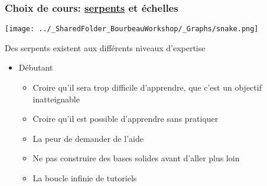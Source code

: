 \documentclass{beamer}
\begin{document}
  \begin{frame}
    
      \frametitle{Choix de cours: \uline{serpents} et échelles} \vspace{1cm}
      
        \begin{center}
        
          \texttt{[image: ../\_SharedFolder\_BourbeauWorkshop/\_Graphs/snake.png]}
         
        \end{center} 
        
  Des serpents existent aux différents niveaux d'expertise
      
    \begin{itemize}
       
      \item{Débutant}
        
          \begin{itemize}
            \item Croire qu'il sera trop difficile d'apprendre, que c'est un objectif inatteignable
            \item Croire qu'il est possible d'apprendre sans pratiquer
            \item La peur de demander de l'aide
            \item Ne pas construire des bases solides avant d'aller plus loin
            \item La boucle infinie de tutoriels

          \end{itemize}
        
        \end{itemize}
        
     \end{frame}
  
\end{document}
